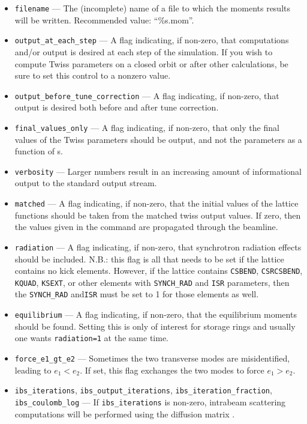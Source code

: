 \documentclass[11pt]{article}
\begin{document}
\begin{itemize}
\item \verb|filename| --- The (incomplete) name of a file to which the moments results will be written.
  Recommended value: ``\%s.mom''.
\item \verb|output_at_each_step| --- A flag indicating, if non-zero, that computations and/or output is desired at each step of the simulation.
  If you wish to compute Twiss parameters on a closed orbit or after other calculations, be sure to set this control to a nonzero value.
\item \verb|output_before_tune_correction| --- A flag indicating, if non-zero, that output is desired both before and after
tune correction.
\item \verb|final_values_only| --- A flag indicating, if non-zero, that only the final values of the Twiss parameters should
be output, and not the parameters as a function of s.
\item \verb|verbosity| --- Larger numbers result in an increasing amount of informational output to the standard output stream.
\item \verb|matched| --- A flag indicating, if non-zero, that the initial values of the lattice functions should be taken from the
  matched twiss output values.  If zero, then the values given in the command are propagated through the beamline.
\item \verb|radiation| --- A flag indicating, if non-zero, that synchrotron radiation effects should be included.
  N.B.: this flag is all that needs to be set if the lattice contains no kick elements.
  However, if the lattice contains \verb|CSBEND|, \verb|CSRCSBEND|, \verb|KQUAD|, 
  \verb|KSEXT|, or other elements with \verb|SYNCH_RAD| and \verb|ISR| parameters, then the \verb|SYNCH_RAD| and\verb|ISR| must be set to 1 for
  those elements as well.
\item \verb|equilibrium| --- A flag indicating, if non-zero, that the equilibrium moments should be found. 
  Setting this is only of interest for storage rings and usually one wants \verb|radiation=1| at the same time.
\item \verb|force_e1_gt_e2| --- Sometimes the two transverse modes are misidentified, leading to $e_1 < e_2$. If set, this
  flag exchanges the two modes to force $e_1>e_2$.
\item \verb|ibs_iterations|, \verb|ibs_output_iterations|, \verb|ibs_iteration_fraction|, \verb|ibs_coulomb_log| ---
  If \verb|ibs_iterations| is non-zero, intrabeam scattering computations will be performed using the diffusion matrix \cite{KuboOide}.

\end{itemize}
\end{document}
